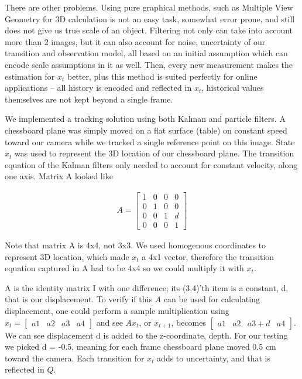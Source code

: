 There are other problems. Using pure graphical methods, such as Multiple View
Geometry for 3D calculation is not an easy task, somewhat error prone, and still
does not give us true scale of an object. Filtering not only can take into
account more than 2 images, but it can also account for noise, uncertainty of
our transition and observation model, all based on an initial assumption which
can encode scale assumptions in it as well. Then, every new measurement makes
the estimation for $x_t$ better, plus this method is suited perfectly for online
applications -- all history is encoded and reflected in $x_t$, historical values
themselves are not kept beyond a single frame.

We implemented a tracking solution using both Kalman and particle filters. A
chessboard plane was simply moved on a flat surface (table) on constant speed
toward our camera while we tracked a single reference point on this image. State
$x_t$ was used to represent the 3D location of our chessboard plane. The
transition equation of the Kalman filters only needed to account for constant
velocity, along one axis. Matrix A looked like

\begin{eqnarray*}
A= \left[
\begin{array}{cccc}
1 & 0 & 0 & 0 \\
0 & 1 & 0 & 0 \\
0 & 0 & 1 & d \\
0 & 0 & 0 & 1
\end{array}
\right]
\end{eqnarray*}

Note that matrix A is 4x4, not 3x3. We used homogenous coordinates to represent
3D location, which made $x_t$ a 4x1 vector, therefore the transition equation
captured in A had to be 4x4 so we could multiply it with $x_t$. 

A is the identity matrix I with one difference; its (3,4)'th item is a constant,
d, that is our displacement. To verify if this $A$ can be used for calculating
displacement, one could perform a sample multiplication using $x_t =
[\begin{array}{cccc}a1 & a2 & a3 & a4 \end{array}]$ and see $Ax_t$, or
$x_{t+1}$, becomes $[\begin{array}{cccc}a1 & a2 & a3+d & a4\end{array}]$. We can
see displacement d is added to the z-coordinate, depth. For our testing we
picked d = -0.5, meaning for each frame chessboard plane moved 0.5 cm toward the
camera. Each transition for $x_t$ adds to uncertainty, and that is reflected in
$Q$.

